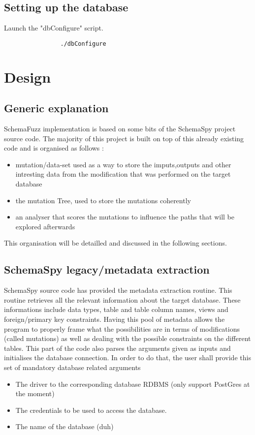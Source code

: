 \documentclass{article}
\begin{document}
		\subsection{Setting up the database}	
	
Launch the "dbConfigure" script.
			\begin{verbatim}
				./dbConfigure
			\end{verbatim}		 
		
	\section{Design}
		\subsection{Generic explanation}
SchemaFuzz implementation is based on some bits of the SchemaSpy project source code.
The majority of this project is built on top of this already existing code and is organised as follows :
		\begin{itemize}
		\item{mutation/data-set used as a way to store the imputs,outputs and other intresting data from the modification that was performed on the target database}
		\item{the mutation Tree, used to store the mutations coherently}
		\item{an analyser that scores the mutations to influence the paths that will be explored afterwards}
		\end{itemize}
		 
This organisation will be detailled and discussed in the following sections.
		\subsection{SchemaSpy legacy/metadata extraction}
SchemaSpy source code has provided the metadata extraction routine. This routine retrieves all the relevant information about the target database. These informations include data types, table and table column names, views and foreign/primary key constraints. Having this pool of metadata allows the program to properly frame what the possibilities are in terms of modifications (called mutations) as well as dealing with the possible constraints on the different tables. 
This part of the code also parses the arguments given as inputs and initialises the database connection.
In order to do that, the user shall provide this set of mandatory database related arguments
			\begin{itemize}
 				\item The driver to the corresponding database RDBMS (only support PostGres at the moment)
 				\item The credentials to be used to access the database.
 				\item The name of the database (duh)
			\end{itemize}
\end{document}
